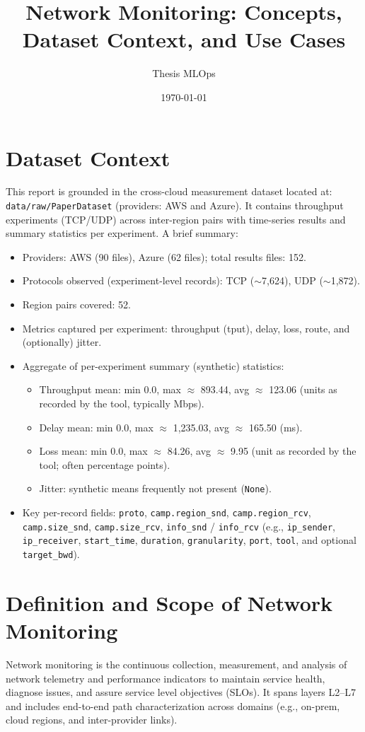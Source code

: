 \documentclass[11pt,a4paper]{article}
\title{Network Monitoring: Concepts, Dataset Context, and Use Cases}
\author{Thesis MLOps}
\date{\today}
\begin{document}
\maketitle

\section*{Dataset Context}
This report is grounded in the cross-cloud measurement dataset located at: \\[-0.6em]
\texttt{data/raw/PaperDataset} (providers: AWS and Azure). It contains throughput experiments (TCP/UDP) across inter-region pairs with time-series results and summary statistics per experiment. A brief summary:
\begin{itemize}[leftmargin=1.2em]
  \item Providers: AWS (90 files), Azure (62 files); total results files: 152.
  \item Protocols observed (experiment-level records): TCP ($\sim$7{,}624), UDP ($\sim$1{,}872).
  \item Region pairs covered: 52.
  \item Metrics captured per experiment: throughput (tput), delay, loss, route, and (optionally) jitter.
  \item Aggregate of per-experiment summary (synthetic) statistics:
  \begin{itemize}[noitemsep]
    \item Throughput mean: min 0.0, max $\approx$ 893.44, avg $\approx$ 123.06 (units as recorded by the tool, typically Mbps).
    \item Delay mean: min 0.0, max $\approx$ 1{,}235.03, avg $\approx$ 165.50 (ms).
    \item Loss mean: min 0.0, max $\approx$ 84.26, avg $\approx$ 9.95 (unit as recorded by the tool; often percentage points).
    \item Jitter: synthetic means frequently not present (\texttt{None}).
  \end{itemize}
  \item Key per-record fields: \texttt{proto}, \texttt{camp.region\_snd}, \texttt{camp.region\_rcv}, \texttt{camp.size\_snd}, \texttt{camp.size\_rcv}, \texttt{info\_snd} / \texttt{info\_rcv} (e.g., \texttt{ip\_sender}, \texttt{ip\_receiver}, \texttt{start\_time}, \texttt{duration}, \texttt{granularity}, \texttt{port}, \texttt{tool}, and optional \texttt{target\_bwd}).
\end{itemize}

\section*{Definition and Scope of Network Monitoring}
Network monitoring is the continuous collection, measurement, and analysis of network telemetry and performance indicators to maintain service health, diagnose issues, and assure service level objectives (SLOs). It spans layers L2--L7 and includes end-to-end path characterization across domains (e.g., on-prem, cloud regions, and inter-provider links).
\end{document}

